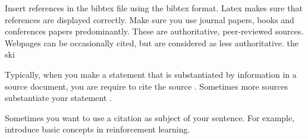 \documentclass[12pt,oneside,a4paper]{article}
\begin{document}
Insert references in the bibtex file using the bibtex format. Latex makes sure that references are displayed correctly. Make sure you use journal papers, books and conferences papers predominantly. These are authoritative, peer-reviewed sources. Webpages can be occasionally cited, but are considered as less authoritative.
the ski

Typically, when you make a statement that is substantiated by information in a source document, you are require to cite the source \citep{bullinaria2009}. Sometimes more sources substantiate your statement \citep{soltoggioSteilNeuralComputation2013,soltoggioHTP2014}. 

Sometimes you want to use a citation as subject of your sentence. For example, \citet{SuttonBarto1998} introduce basic concepts in reinforcement learning.





\end{document}

